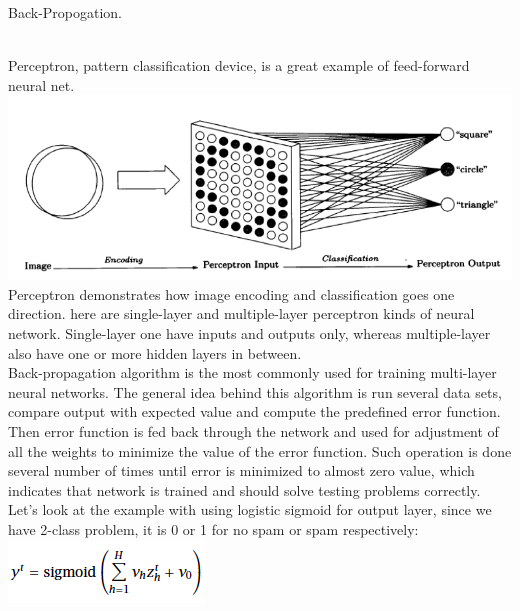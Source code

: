 \documentclass[12pt, letterpaper]{article}
\begin{document}
\begin{enumerate}[label=\Roman*.]
 
 	{\bf \item Back-Propogation.} \\
	
 	Perceptron, pattern classification device, is a great example of feed-forward neural net. \\
	{\center \includegraphics[scale=1]{1.png} \\}
	Perceptron demonstrates how image encoding and classification goes one direction. here are single-layer and multiple-layer perceptron kinds of neural network. Single-layer one have inputs and outputs only, whereas multiple-layer also have one or more hidden layers in between.\\
	
	Back-propagation algorithm is the most commonly used for training multi-layer neural networks. The general idea behind this algorithm is run several data sets, compare output with expected value and compute the predefined error function. Then error function is fed back through the network and used for adjustment of all the weights to minimize the value of the error function. Such operation is done several number of times until error is minimized to almost zero value, which indicates that network is trained and should solve testing problems correctly. Let's look at the example with using logistic sigmoid for output layer, since we have 2-class problem, it is 0 or 1 for no spam or spam respectively:
	{\center \includegraphics[scale=0.5]{7.png} \\}
	

\end{enumerate}
\end{document}
